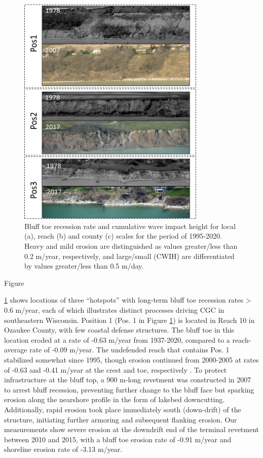 \begin{figure}[htbp] 
\centering
\includegraphics[width=0.8\textwidth]{chapter2/resources/figure2-8.jpg}
\caption{Bluff toe recession rate and cumulative wave impact height for local
(a), reach (b) and county (c) scales for the period of 1995-2020. Heavy and mild
erosion are distinguished as values greater/less than 0.2 m/year, respectively,
and large/small (CWIH) are differentiated by values greater/less than 0.5
m/day.} 
\label{fig:fig2.8} 
\end{figure} Figure 

\ref{fig:fig2.8} shows locations of three “hotspots” with long-term bluff toe
recession rates > 0.6 m/year, each of which illustrates distinct processes
driving CGC in southeastern Wisconsin.  Position 1 (Pos. 1 in Figure
\ref{fig:fig2.8}) is located in Reach 10 in Ozaukee County, with few coastal
defense structures. The bluff toe in this location eroded at a rate of -0.63
m/year from 1937-2020, compared to a reach-average rate of -0.09 m/year. The
undefended reach that contains Pos. 1 stabilized somewhat since 1995, though
erosion continued from 2000-2005 at rates of -0.63 and -0.41 m/year at the crest
and toe, respectively \citep{lin_field_2014}. To protect infrastructure at the bluff
top, a 900 m-long revetment was constructed in 2007 to arrest bluff recession,
preventing further change to the bluff face but sparking erosion along the
nearshore profile in the form of lakebed downcutting. Additionally, rapid
erosion took place immediately south (down-drift) of the structure, initiating
further armoring  and subsequent flanking erosion. Our measurements show severe
erosion at the downdrift end of the terminal revetment between 2010 and 2015,
with a bluff toe erosion rate of -0.91 m/year and shoreline erosion rate of
-3.13 m/year.


